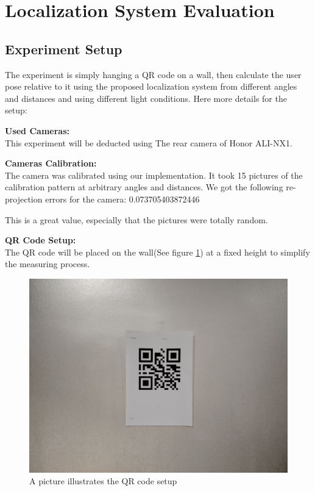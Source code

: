 \section{Localization System Evaluation}

\subsection{Experiment Setup}

The experiment is simply hanging a QR code on a wall, then calculate the user pose relative to it using the proposed localization system from different angles and distances and using different light conditions. Here more details for the setup:

\textbf{Used Cameras:}\\
This experiment will be deducted using The rear camera of Honor ALI-NX1.

\textbf{Cameras Calibration:}\\
The camera was calibrated using our implementation. It took 15 pictures of the calibration pattern at arbitrary angles and distances. We got the following re-projection errors for the camera: 0.073705403872446

This is a great value, especially that the pictures were totally random.

\textbf{QR Code Setup:}\\
The QR code will be placed on the wall(See figure \ref{Localization-Experiment-QR-Setup}) at a fixed height to simplify the measuring process.

\begin{figure}[h!]
	\centering
	\includegraphics[width=0.7\linewidth]{assets/ch4/QR on a wall.jpg}
	\caption{A picture illustrates the QR code setup}
	\label{Localization-Experiment-QR-Setup}
\end{figure}

